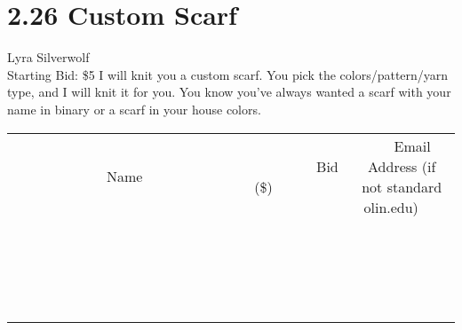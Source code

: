 \documentclass[11pt]{article}
\begin{document}
\section*{2.26 Custom Scarf}
Lyra Silverwolf
\\
Starting Bid: \$5
\newline
I will knit you a custom scarf. You pick the colors/pattern/yarn type, and I will knit it for you. You know you've always wanted a scarf with your name in binary or a scarf in your house colors.
\\[3ex]
\begin{tabular}{c c c}
~~~~~~~~~~~~~Name~~~~~~~~~~~~~ & ~~~~~~~~~Bid (\$)~~~~~~~~~  & ~~~Email Address (if not standard olin.edu)~~~\\
 & & \\
\hline
 & & \\
\hline
 & & \\
\hline
 & & \\
\hline
 & & \\
\hline
 & & \\
\hline
 & & \\
\hline
 & & \\
\hline
 & & \\
\hline
 & & \\
\hline
 & & \\
\hline
 & & \\
\hline
 & & \\
\hline
 & & \\
\hline
 & & \\
\hline
 & & \\
\hline
 & & \\
\hline
 & & \\
\hline
 & & \\
\hline
\end{tabular}
\newpage
\end{document}

